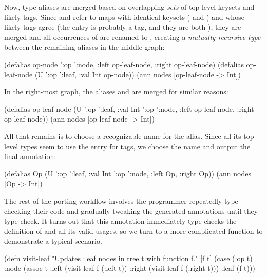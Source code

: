 Now, type aliases are merged based on overlapping \emph{sets} of top-level keysets and likely tags.
Since  and  refer to maps with identical keysets
( and ) and whose likely tags agree (the  entry
is probably a tag, and they are both ),
they are merged and all occurrences of 
are renamed to , creating a \emph{mutually recursive type}
between the remaining aliases in the middle graph:

\begin{cljlisting}
(defalias op-node '{:op ':node, :left op-leaf-node, :right op-leaf-node})
(defalias op-leaf-node (U '{:op ':leaf, :val Int} op-node))
(ann nodes [op-leaf-node -> Int])
\end{cljlisting}

In the right-most graph, the aliases  and  are merged for similar reasons:

\begin{cljlisting}
(defalias op-leaf-node (U '{:op ':leaf, :val Int}
                          '{:op ':node, :left op-leaf-node, :right op-leaf-node}))
(ann nodes [op-leaf-node -> Int])
\end{cljlisting}

All that remains is to choose a recognizable name for the alias.
Since all its top-level types seem to use the  entry for
tags, we choose the name  and output the final annotation:

\begin{cljlisting}
(defalias Op (U '{:op ':leaf, :val Int}
                '{:op ':node, :left Op, :right Op}))
(ann nodes [Op -> Int])
\end{cljlisting}

The rest of the porting workflow involves the programmer repeatedly type checking
their code and gradually tweaking the generated annotations until they type check.
It turns out that this annotation immediately type checks the definition of 
and all its valid usages, so we turn to a more complicated function 
to demonstrate a typical scenario.

\begin{cljlisting}
(defn visit-leaf "Updates :leaf nodes in tree t with function f."
  [f t] (case (:op t)
          :node (assoc t :left (visit-leaf f (:left t))
                         :right (visit-leaf f (:right t)))
          :leaf (f t)))
\end{cljlisting}

